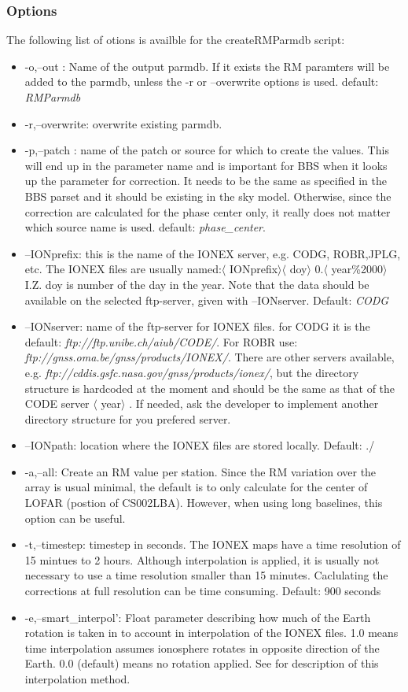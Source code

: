 \documentclass{article}
\begin{document}
\subsubsection{Options}

The following list of otions is availble for the createRMParmdb script:
\begin{itemize}
\item -o,--out : Name of the output parmdb. If it exists the RM paramters will
  be added to the parmdb, unless the -r or --overwrite options is
  used. default: \emph{RMParmdb}
\item -r,--overwrite: overwrite existing parmdb.
\item -p,--patch : name of the patch or source for which to create the
  values. This will end up in the parameter name and is important for BBS when
  it looks up the parameter for correction. It needs to be the same as
  specified in the BBS parset and it should be existing in the sky
  model. Otherwise, since the correction are calculated for the phase center
  only, it really does not matter which source name is used. default:
  \emph{phase\_center}.
\item --IONprefix: this is the name of the IONEX server, e.g. CODG, ROBR,JPLG,
  etc. The IONEX files are usually named:$\langle$ IONprefix$\rangle$$\langle$
  doy$\rangle$ 0.$\langle$ year\%2000$\rangle$ I.Z. doy
  is number of the day in the year. Note
  that the data should be available on the selected ftp-server, given with
  --IONserver. Default: \emph{CODG}
\item --IONserver: name of the ftp-server for IONEX files. for CODG it is the
  default: \emph{ftp://ftp.unibe.ch/aiub/CODE/}. For ROBR use:
  \emph{ftp://gnss.oma.be/gnss/products/IONEX/}. There are other servers
  available, e.g. \emph{ftp://cddis.gsfc.nasa.gov/gnss/products/ionex/}, but the directory structure is hardcoded at the moment and should
  be the same as that of the CODE server $\langle$ year$\rangle$ . If needed, ask the developer to
  implement another directory structure for you prefered server.
\item --IONpath: location where the IONEX files are stored locally. Default: ./
\item -a,--all: Create an RM value per station. Since the RM variation over
  the array is usual minimal, the default is to only calculate for the center
  of LOFAR (postion of CS002LBA). However, when using long baselines, this option can be useful.
\item -t,--timestep: timestep in seconds. The IONEX maps have a time resolution of
  15 mintues to 2 hours. Although interpolation is applied, it is usually not
  necessary to use a time resolution smaller than 15 minutes. Caclulating the
  corrections at full resolution can be time consuming.  Default: 900 seconds
\item -e,--smart\_interpol': Float parameter describing how much of the Earth
  rotation is taken in to account in interpolation of the IONEX files. 1.0
  means time interpolation assumes ionosphere rotates in opposite direction of
  the Earth. 0.0 (default) means no rotation applied. See \cite{ionex} for
  description of this interpolation method.


\end{itemize}
\end{document}
